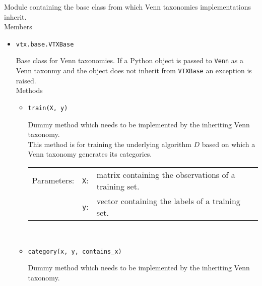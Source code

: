 \documentclass[twoside,11pt]{article}
\def\wo{~\\}
\begin{document}
\begin{appendices}
\begin{itemize}
\begin{itemize}
          Module containing the base class from which Venn
          taxonomies implementations inherit.
          \\

          Members

          \begin{itemize}

            \item
              \texttt{vtx.base.VTXBase}

              Base class for Venn taxonomies. If a Python
              object is passed to \texttt{Venn} as a
              Venn taxonmy and the object does not inherit
              from \texttt{VTXBase} an exception is raised.
              \\

              Methods

              \begin{itemize}

                \item
                  \texttt{train(X, y)}

                  Dummy method which needs to be
                  implemented by the inheriting
                  Venn taxonomy.
                  \\

                  This method is for training the
                  underlying algorithm $D$ based on which
                  a Venn taxonomy generates its categories.
                  \\

                  \begin{tabu}{llX}
                    Parameters: &\texttt{X}:
                                &matrix containing the
                                 observations of a training
                                 set.
                                 \\
                                &\texttt{y}:
                                &vector containing the
                                 labels of a training set.
                                 \\
                  \end{tabu}
                  \wo

                \item
                  \texttt{category(x, y, contains\_x)}

                  Dummy method which needs to be
                  implemented by the inheriting
                  Venn taxonomy.
                  \\


\end{itemize}
\end{itemize}
\end{itemize}
\end{itemize}
\end{appendices}
\end{document}
